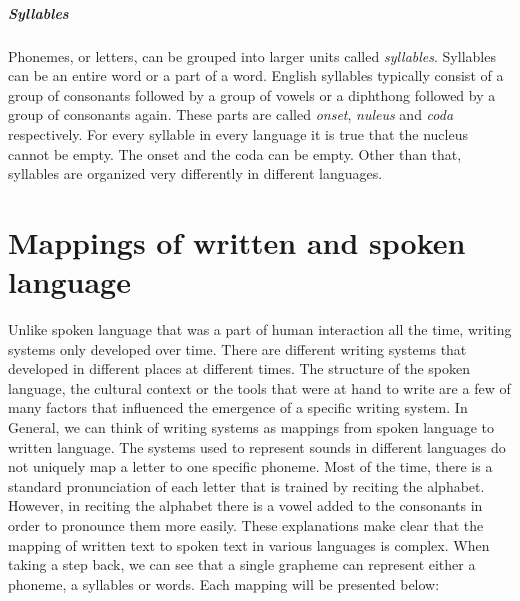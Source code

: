 \subparagraph{Syllables} Phonemes, or letters, can be grouped into larger units called \textit{syllables}. Syllables can be an entire word or a part of a word. English syllables typically consist of a group of consonants followed by a group of vowels or a diphthong followed by a group of consonants again. These parts are called \textit{onset}, \textit{nuleus} and \textit{coda} respectively.  For every syllable in every language it is true that the nucleus cannot be empty. The onset and the coda can be empty. Other than that, syllables are organized very differently in different languages. \citep{Intro.2007}



\section{Mappings of written and spoken language}
\label{writing-sys}
Unlike spoken language that was a part of human interaction all the time, writing systems only developed over time. There are different writing systems that developed in different places at different times. The structure of the spoken language, the cultural context or the tools that were at hand to write are a few of many factors that influenced the emergence of a specific writing system. In General, we can think of writing systems as mappings from spoken language to written language. The systems used to represent sounds in different languages do not uniquely map a letter to one specific phoneme. Most of the time, there is a standard pronunciation of each letter that is trained by reciting the alphabet. However, in reciting the alphabet there is a vowel added to the consonants in order to pronounce them more easily. These explanations make clear that the mapping of written text to spoken text in various languages is complex. When taking a step back, we can see that a single grapheme can represent either a phoneme, a syllables or words. Each mapping will be presented below: 

